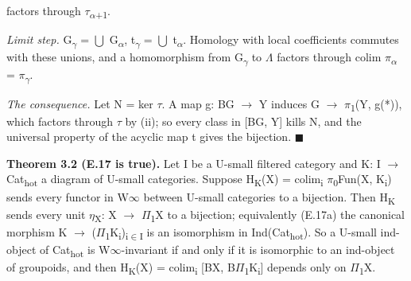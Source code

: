 factors through \ensuremath{\tau}\textsubscript{\ensuremath{\alpha}+1}.

\emph{Limit step.} G\textsubscript{\ensuremath{\gamma}} = \ensuremath{\bigcup} G\textsubscript{\ensuremath{\alpha}}, t\textsubscript{\ensuremath{\gamma}} = \ensuremath{\bigcup} t\textsubscript{\ensuremath{\alpha}}. Homology with local coefficients commutes with these unions, and a homomorphism from G\textsubscript{\ensuremath{\gamma}} to \ensuremath{\Lambda} factors through colim \ensuremath{\pi}\textsubscript{\ensuremath{\alpha}} = \ensuremath{\pi}\textsubscript{\ensuremath{\gamma}}.

\emph{The consequence.} Let N = ker \ensuremath{\tau}. A map g: BG \ensuremath{\to} Y induces G \ensuremath{\to} \ensuremath{\pi}\textsubscript{1}(Y, g(*)), which factors through \ensuremath{\tau} by (ii); so every class in [BG, Y] kills N, and the universal property of the acyclic map t gives the bijection. \ensuremath{\blacksquare}

\textbf{Theorem 3.2 (E.17 is true).} Let I be a U-small filtered category and K: I \ensuremath{\to} Cat\textsubscript{hot} a diagram of U-small categories. Suppose H\textsubscript{K}(X) = colim\textsubscript{i} \ensuremath{\pi}\textsubscript{0}Fun(X, K\textsubscript{i}) sends every functor in W\ensuremath{\infty} between U-small categories to a bijection. Then H\textsubscript{K} sends every unit \ensuremath{\eta}\textsubscript{X}: X \ensuremath{\to} \ensuremath{\Pi}\textsubscript{1}X to a bijection; equivalently (E.17a) the canonical morphism K \ensuremath{\to} (\ensuremath{\Pi}\textsubscript{1}K\textsubscript{i})\textsubscript{i\ensuremath{\in}I} is an isomorphism in Ind(Cat\textsubscript{hot}). So a U-small ind-object of Cat\textsubscript{hot} is W\ensuremath{\infty}-invariant if and only if it is isomorphic to an ind-object of groupoids, and then H\textsubscript{K}(X) = colim\textsubscript{i} [BX, B\ensuremath{\Pi}\textsubscript{1}K\textsubscript{i}] depends only on \ensuremath{\Pi}\textsubscript{1}X.

